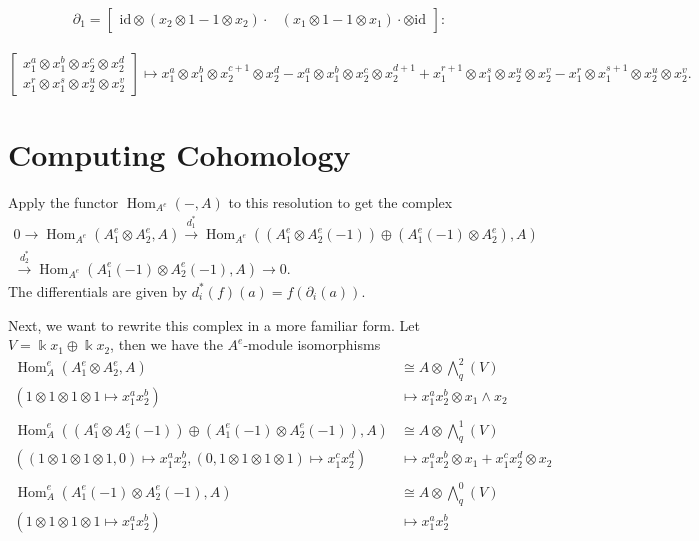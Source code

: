 \documentclass[12pt,a4paper]{article}
\DeclareMathOperator{\Hom}{Hom}
\newcommand{\Wedge}{\textstyle\bigwedge}
\newcommand{\kk}{\Bbbk}
\newcommand\1{_{(1)}}
\newcommand\2{_{(2)}}
\begin{document}
\newpage
\[\partial_1=\begin{bmatrix}\text{id}\otimes(x_2\otimes 1-1\otimes x_2)\cdot&(x_1\otimes 1-1\otimes x_1)\cdot\otimes\text{id}\end{bmatrix}:\]\\
\[\begin{bmatrix}x_1^a\otimes x_1^b\otimes x_2^c\otimes x_2^d\\x_1^r\otimes x_1^s\otimes x_2^u\otimes x_2^v\end{bmatrix}\mapsto x_1^a\otimes x_1^b\otimes x_2^{c+1}\otimes x_2^d-x_1^a\otimes x_1^b\otimes x_2^c\otimes x_2^{d+1}
+ x_1^{r+1}\otimes x_1^s\otimes x_2^u\otimes x_2^v-x_1^r\otimes x_1^{s+1}\otimes x_2^u\otimes x_2^v.
\]

\section{Computing Cohomology}
Apply the functor $\Hom_{A^e}(-,A)$ to this resolution to get the complex
\begin{align*}
0\to \Hom_{A^e}(A_1^e\otimes A_2^e,A)\xrightarrow{d_1^*} \Hom_{A^e}(\left(A_1^e\otimes A_2^e(-1)\right)\oplus\left(A_1^e(-1)\otimes A_2^e\right),A)\\\xrightarrow{d_2^*}\Hom_{A^e}(A_1^e(-1)\otimes A_2^e(-1),A)\to 0.  
\end{align*}
The differentials are given by $d_i^*(f)(a)=f(\partial_i(a))$.

Next, we want to rewrite this complex in a more familiar form.
Let $V=\kk x_1\oplus \kk x_2$, then we have the $A^e$-module isomorphisms
\begin{align*}
\Hom_A^e(A_1^e\otimes A_2^e,A)&\cong A\otimes \Wedge_q^2(V)\\
(1\otimes 1\otimes 1\otimes 1\mapsto x_1^ax_2^b)&\mapsto x_1^ax_2^b\otimes x_1\wedge x_2\\
\\
\Hom_A^e(\left(A^e_1\otimes A_2^e(-1)\right)\oplus\left(A_1^e(-1)\otimes A_2^e(-1)\right),A)&\cong A\otimes\Wedge_q^1(V)\\
((1\otimes 1\otimes 1\otimes 1,0)\mapsto x_1^ax_2^b,(0,1\otimes 1\otimes 1\otimes 1)\mapsto x_1^cx_2^d)&\mapsto x_1^ax_2^b\otimes x_1+x_1^cx_2^d\otimes x_2\\
\\
\Hom_A^e(A_1^e(-1)\otimes A_2^e(-1),A)&\cong A\otimes\Wedge_q^0(V)\\
(1\otimes 1\otimes 1\otimes 1\mapsto x_1^ax_2^b)&\mapsto x_1^ax_2^b
\end{align*}
\end{document}
